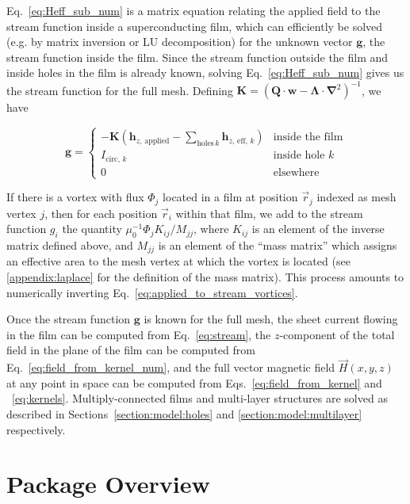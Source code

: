 \documentclass[final,3p,times]{elsarticle}
\newcounter{bla}
\begin{document}
Eq.~\ref{eq:Heff_sub_num} is a matrix equation relating the applied field to the stream function
inside a superconducting film, which can efficiently be solved (e.g. by matrix inversion or LU decomposition) for the unknown vector $\mathbf{g}$, the stream function inside the film. Since the stream function outside the film and inside holes in the film is already known, solving Eq.~\ref{eq:Heff_sub_num} gives us the stream function for the full mesh. Defining $\mathbf{K} = \left(\mathbf{Q}\cdot\mathbf{w}-\mathbf{\Lambda}\cdot\mathbf{\nabla}^2\right)^{-1}$, we have

\begin{equation}
    \label{eq:full_stream}
    \mathbf{g} = \begin{cases}
        -\mathbf{K}
        \left(\mathbf{h}_{z,\,\mathrm{applied}} - \sum_{\mathrm{holes}\,k}\mathbf{h}_{z,\,\mathrm{eff},\,k}\right)
            & \text{inside the film}\\
        I_{\mathrm{circ},\,k}
            & \text{inside hole }k\\
        0
            & \text{elsewhere}
    \end{cases}
\end{equation}

If there is a vortex with flux $\Phi_j$ located in a film at position $\vec{r}_j$ indexed as mesh vertex $j$, then for each position $\vec{r}_i$ within that film, we add to the stream function $g_i$ the quantity $\mu_0^{-1}\Phi_jK_{ij} / M_{jj}$, where $K_{ij}$ is an element of the inverse matrix defined above, and $M_{jj}$ is an element of the ``mass matrix'' which assigns an effective area to the mesh vertex at which the vortex is located (see \ref{appendix:laplace} for the definition of the mass matrix). This process amounts to numerically inverting Eq.~\ref{eq:applied_to_stream_vortices}.

Once the stream function $\mathbf{g}$ is known for the full mesh,
the sheet current flowing in the film can be computed from Eq.~\ref{eq:stream}, the $z$-component of the total field in the plane of the film can be computed
from Eq.~\ref{eq:field_from_kernel_num}, and the full vector magnetic field $\vec{H}(x, y, z)$
at any point in space can be computed from Eqs.~\ref{eq:field_from_kernel} and ~\ref{eq:kernels}. Multiply-connected films and multi-layer structures are solved as described in Sections~\ref{section:model:holes} and \ref{section:model:multilayer} respectively.

\section{Package Overview}
\label{section:overview}
\end{document}

